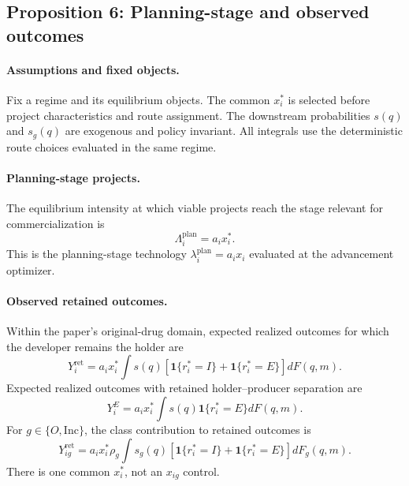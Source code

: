 \subsection{Proposition 6: Planning-stage and observed outcomes}
\label{prop:p08-outcomes}

\paragraph{Assumptions and fixed objects.}
Fix a regime and its equilibrium objects. The common \(x_i^*\) is selected
before project characteristics and route assignment. The downstream
probabilities \(s(q)\) and \(s_g(q)\) are exogenous and policy invariant.
All integrals use the deterministic route choices evaluated in the same
regime.

\paragraph{Planning-stage projects.}
The equilibrium intensity at which viable projects reach the stage relevant
for commercialization is
\begin{equation}
  \Lambda_i^{\mathrm{plan}}
  =
  a_ix_i^*.
  \label{eq:p08-planning-arrival}
\end{equation}
This is the planning-stage technology
\(\lambda_i^{\mathrm{plan}}=a_ix_i\) evaluated at the advancement optimizer.

\paragraph{Observed retained outcomes.}
Within the paper's original-drug domain, expected realized outcomes for which
the developer remains the holder are
\begin{equation}
  Y_i^{\mathrm{ret}}
  =
  a_ix_i^*
  \int
  s(q)
  \left[
    \mathbf 1\{r_i^*=I\}
    +
    \mathbf 1\{r_i^*=E\}
  \right]
  dF(q,m).
  \label{eq:p08-retained-outcome}
\end{equation}
Expected realized outcomes with retained holder--producer separation are
\begin{equation}
  Y_i^E
  =
  a_ix_i^*
  \int
  s(q)\mathbf 1\{r_i^*=E\}
  dF(q,m).
  \label{eq:p08-entrusted-outcome}
\end{equation}
For \(g\in\{O,\mathrm{Inc}\}\), the class contribution to retained
outcomes is
\begin{equation}
  Y_{ig}^{\mathrm{ret}}
  =
  a_ix_i^*\rho_g
  \int
  s_g(q)
  \left[
    \mathbf 1\{r_i^*=I\}
    +
    \mathbf 1\{r_i^*=E\}
  \right]
  dF_g(q,m).
  \label{eq:p08-type-outcome}
\end{equation}
There is one common \(x_i^*\), not an \(x_{ig}\) control.


